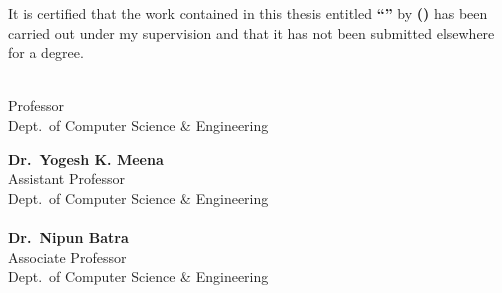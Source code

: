 \documentclass[11pt, a4paper, oneside]{Thesis}
\begin{document}
\setcounter{page}{2}

\begin{minipage}{\textwidth}
    It is certified that the work contained in this thesis entitled \textbf{\enquote{\ttitle}} by \textbf{\authornames} \textbf{(\rollno)} has been carried out under my supervision and that it has not been submitted elsewhere for a degree.
\end{minipage}

\vspace{20.00mm}

\begin{minipage}{0.45\textwidth}
\begin{flushleft}
    \textbf{\supnameA}\\
    Professor\\
    Dept.\ of Computer Science \& Engineering\\
    \univname
\end{flushleft}
\end{minipage}
\hfill
\begin{minipage}{0.45\textwidth}
\begin{flushright}
    \textbf{Dr.\ Yogesh K. Meena}\\
    Assistant Professor\\
    Dept.\ of Computer Science \& Engineering\\
    \univname\\[0.6cm]
    \textbf{Dr.\ Nipun Batra}\\
    Associate Professor\\
    Dept.\ of Computer Science \& Engineering\\
    \univname
\end{flushright}
\end{minipage}

\vfill

\clearpage

\end{document}
